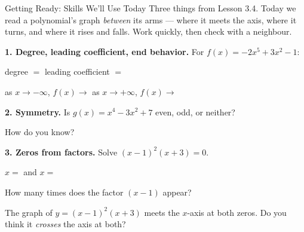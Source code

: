 \documentclass[12pt]{article}
\begin{document}

\vspace{0.10in}

\begin{notesbox}{Getting Ready: Skills We'll Use Today}
Three things from Lesson 3.4. Today we read a polynomial's graph \emph{between} its arms ---
where it meets the axis, where it turns, and where it rises and falls. Work quickly, then check
with a neighbour.

\vspace{8pt}
\textbf{1. Degree, leading coefficient, end behavior.} For $f(x)=-2x^5+3x^2-1$:

\vspace{4pt}
\hspace*{1.5em}degree $=$  \qquad leading coefficient $=$ 

\vspace{6pt}
\hspace*{1.5em}as $x\to-\infty$, $f(x)\to$ \ans{$+\infty$} \qquad as $x\to+\infty$, $f(x)\to$ \ans{$-\infty$}

\vspace{10pt}
\textbf{2. Symmetry.} Is $g(x)=x^4-3x^2+7$ even, odd, or neither? 

\vspace{4pt}
\hspace*{1.5em}How do you know? 

\vspace{10pt}
\textbf{3. Zeros from factors.} Solve $(x-1)^2(x+3)=0$.

\vspace{4pt}
\hspace*{1.5em}$x=$  \quad and \quad $x=$ 

\vspace{6pt}
\hspace*{1.5em}How many times does the factor $(x-1)$ appear? 

\vspace{6pt}
\hspace*{1.5em}The graph of $y=(x-1)^2(x+3)$ meets the $x$-axis at both zeros. Do you think it
\emph{crosses} the axis at both? 
\end{notesbox}
\end{document}
